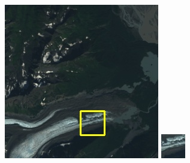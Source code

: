 \documentclass[UTF8]{ctexart}
\begin{document}
\begin{figure}[H]
{\begin{minipage}[b]{0.15\linewidth}
            \includegraphics[width=1\linewidth]{../log/cut/LC80650182013237LGN00_10854_color.jpg}\vspace{4pt}
            \includegraphics[width=1\linewidth]{../log/cut/tmp_cut_LC80650182013237LGN00_10854_color.jpg}

\end{minipage}}
\end{figure}
\end{document}
